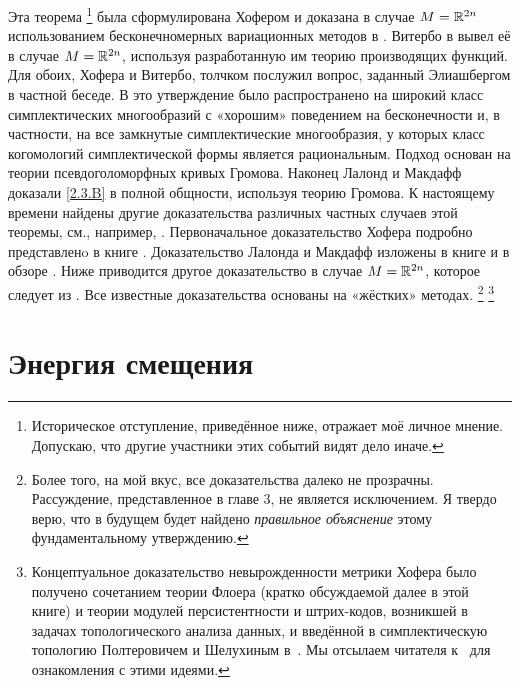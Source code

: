 Эта теорема%
\footnote{Историческое отступление, приведённое ниже, отражает моё личное мнение.
Допускаю, что другие участники этих событий видят дело иначе.}
была сформулирована Хофером и доказана в случае $M = \mathbb{R}^{2n}$
использованием бесконечномерных вариационных методов в \cite{H1}.
Витербо в \cite{V1} вывел её в случае $M = \mathbb{R}^{2n}$,
используя разработанную им теорию производящих функций.
Для обоих, Хофера и Витербо, толчком послужил вопрос, заданный
Элиашбергом в частной беседе.
В \cite{P1} это утверждение было распространено на широкий класс
симплектических многообразий с «хорошим» поведением на бесконечности
и, в частности, на все замкнутые симплектические многообразия, у
которых класс когомологий симплектической формы является
рациональным.
Подход \cite{P1} основан на теории псевдоголоморфных кривых Громова.
Наконец \cite{LM1} Лалонд и Макдафф доказали \ref{2.3.B} в полной
общности, используя теорию Громова. 
К настоящему времени найдены другие доказательства различных частных случаев этой теоремы, см., например, \cite{Ch,O3,Sch3}.
Первоначальное доказательство Хофера подробно представленo в книге
\cite{HZ}.
Доказательство Лалонда и Макдафф изложены в книге \cite{MS} и в обзоре \cite{L}.
Ниже приводится другое доказательство в случае $M = \mathbb{R}^{2n}$, которое следует из \cite{P1}.
Все известные доказательства основаны на «жёстких» методах.%
\footnote{Более того, на мой вкус, все доказательства далеко не
  прозрачны.
  Рассуждение, представленное в главе 3, не является исключением.
  Я твердо верю, что в будущем будет найдено {}\emph{правильное
    объяснение} этому фундаментальному утверждению.}%
\footnote{  %
  Концептуальное доказательство невырожденности метрики Хофера
  было получено сочетанием теории Флоера (кратко обсуждаемой далее в
  этой книге) и теории модулей персистентности и штрих-кодов, возникшей в
  задачах топологического анализа данных, и введённой в симплектическую
  топологию Полтеровичем и Шелухиным в~\cite{PS16}. Мы отсылаем
  читателя к~\cite{PS16,UZ,PRSZ} для ознакомления с этими
  идеями.\dpp}

\section{Энергия смещения}\label{sec:2.4}


